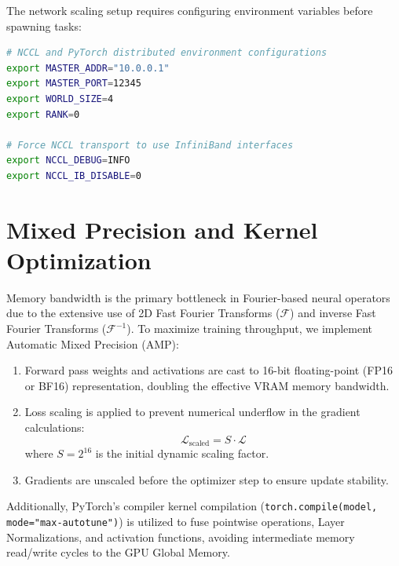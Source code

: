 \documentclass[12pt,titlepage,a4paper]{report}
\begin{document}
The network scaling setup requires configuring environment variables before spawning tasks:
\begin{lstlisting}[language=bash, caption=Environment Variables for NCCL and DDP]
# NCCL and PyTorch distributed environment configurations
export MASTER_ADDR="10.0.0.1"
export MASTER_PORT=12345
export WORLD_SIZE=4
export RANK=0

# Force NCCL transport to use InfiniBand interfaces
export NCCL_DEBUG=INFO
export NCCL_IB_DISABLE=0
\end{lstlisting}

\section{Mixed Precision and Kernel Optimization}
Memory bandwidth is the primary bottleneck in Fourier-based neural operators due to the extensive use of 2D Fast Fourier Transforms ($\mathcal{F}$) and inverse Fast Fourier Transforms ($\mathcal{F}^{-1}$). To maximize training throughput, we implement Automatic Mixed Precision (AMP):
\begin{enumerate}
    \item Forward pass weights and activations are cast to 16-bit floating-point (FP16 or BF16) representation, doubling the effective VRAM memory bandwidth.
    \item Loss scaling is applied to prevent numerical underflow in the gradient calculations:
    \begin{equation}
        \mathcal{L}_{\text{scaled}} = S \cdot \mathcal{L}
    \end{equation}
    where $S = 2^{16}$ is the initial dynamic scaling factor.
    \item Gradients are unscaled before the optimizer step to ensure update stability.
\end{enumerate}

Additionally, PyTorch's compiler kernel compilation (\texttt{torch.compile(model, mode="max-autotune")}) is utilized to fuse pointwise operations, Layer Normalizations, and activation functions, avoiding intermediate memory read/write cycles to the GPU Global Memory.
\end{document}
